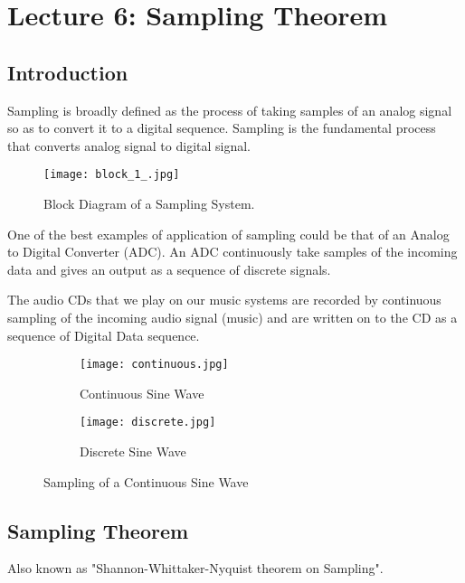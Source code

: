 \section{Lecture 6: Sampling Theorem}



\subsection{Introduction}
Sampling is broadly defined as the process of taking samples of an analog signal so as to convert it to a digital sequence. Sampling is the fundamental process that converts analog signal to digital signal. 

\begin{figure}[ht]
\centering
\texttt{[image: block\_1\_.jpg]}
\caption{\label{fig:}Block Diagram of a Sampling System.}
\end{figure}



One of the best examples of application of  sampling could be that of an Analog to Digital Converter (ADC). An ADC continuously take samples of the incoming data and gives an output as a sequence of discrete signals.  

The audio CDs that we play on our music systems are recorded by continuous sampling of the incoming audio signal (music) and are written on to the CD as a sequence of Digital Data sequence.



\begin{figure}[h]
 
\begin{subfigure}{0.5\textwidth}
\texttt{[image: continuous.jpg]} 
\caption{Continuous Sine Wave}
\label{fig:subim1}
\end{subfigure}
\begin{subfigure}{0.5\textwidth}
\texttt{[image: discrete.jpg]}
\caption{Discrete Sine Wave}
\label{fig:subim2}
\end{subfigure}
 
\caption{Sampling of a Continuous Sine Wave}
\label{fig:image2}
\end{figure}


\subsection{Sampling Theorem}
Also known as "Shannon-Whittaker-Nyquist theorem on Sampling".

